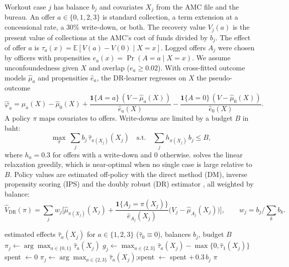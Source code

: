 \documentclass[10pt]{article}
\newcommand{\Exp}{\mathbb{E}}
\newcommand{\ind}{\mathbf{1}}
\begin{document}
Workout case $j$ has balance $b_j$ and covariates $X_j$ from the AMC file and the bureau. An offer $a\in\{0,1,2,3\}$ is standard collection, a term extension at a concessional rate, a 30\% write-down, or both. The recovery value $V_j(a)$ is the present value of collections at the AMC's cost of funds divided by $b_j$. The effect of offer $a$ is $\tau_a(x) = \Exp[V(a)-V(0)\mid X=x]$. Logged offers $A_j$ were chosen by officers with propensities $e_a(x)=\Pr(A=a\mid X=x)$. We assume unconfoundedness given $X$ and overlap ($e_a \ge 0.02$). With cross-fitted outcome models $\hat\mu_a$ and propensities $\hat e_a$, the DR-learner \citep{kennedy2023} regresses on $X$ the pseudo-outcome
\begin{equation}\label{eq:dr}
\hat\varphi_{a} = \hat\mu_a(X) - \hat\mu_0(X) + \frac{\ind\{A=a\}\,(V-\hat\mu_a(X))}{\hat e_a(X)} - \frac{\ind\{A=0\}\,(V-\hat\mu_0(X))}{\hat e_0(X)}.
\end{equation}
A policy $\pi$ maps covariates to offers. Write-downs are limited by a budget $B$ in baht:
\begin{equation}\label{eq:policy}
\max_{\pi}\ \sum_j b_j\,\hat\tau_{\pi(X_j)}(X_j) \quad\text{s.t.}\quad \sum_j h_{\pi(X_j)}\,b_j \le B,
\end{equation}
where $h_a = 0.3$ for offers with a write-down and $0$ otherwise.  solves the linear relaxation greedily, which is near-optimal when no single case is large relative to $B$. Policy values are estimated off-policy with the direct method (DM), inverse propensity scoring (IPS) and the doubly robust (DR) estimator \citep{dudik2011}, all weighted by balance:
\begin{equation}\label{eq:ope}
\hat V_{\text{DR}}(\pi) = \sum_j w_j\Big[\hat\mu_{\pi(X_j)}(X_j) + \frac{\ind\{A_j=\pi(X_j)\}}{\hat e_{A_j}(X_j)}\big(V_j - \hat\mu_{A_j}(X_j)\big)\Big],\qquad w_j = b_j \Big/ \textstyle\sum_k b_k .
\end{equation}

\begin{algorithm}[t]
\caption{Write-down-budgeted offer allocation}\label{alg:budget}
\small
\begin{algorithmic}[1]
\Require estimated effects $\hat\tau_a(X_j)$ for $a\in\{1,2,3\}$ ($\hat\tau_0\equiv 0$), balances $b_j$, budget $B$
  \State $\pi_j \gets \arg\max_{a\in\{0,1\}} \hat\tau_a(X_j)$ 
  \State $g_j \gets \max_{a\in\{2,3\}} \hat\tau_a(X_j) - \max\{0, \hat\tau_1(X_j)\}$ 
\EndFor
\State spent $\gets 0$
    \State $\pi_j \gets \arg\max_{a\in\{2,3\}} \hat\tau_a(X_j)$;\quad spent $\gets$ spent $+\,0.3\,b_j$
  \EndIf
\EndFor
\State \Return $\pi$
\end{algorithmic}
\end{algorithm}
\end{document}
